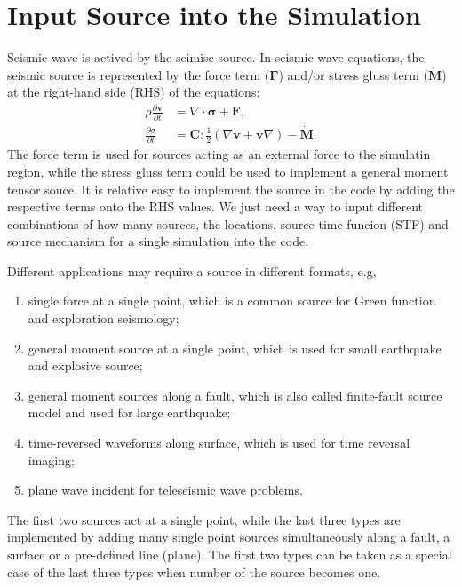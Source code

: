 \chapter{Input Source into the Simulation}\label{chapter-source}

Seismic wave is actived by the seimisc source.
In seismic wave equations, the seismic source is represented by the force term ($\mathbf{F}$)
 and/or stress gluss term ($\mathbf{\dot{\mathbf{M}}}$) at the right-hand side (RHS) of the equations:
\begin{align}
   \rho \frac{\partial \mathbf{v}}{\partial t} &= \nabla \cdot \mathbf{\sigma} + \mathbf{F}, \\
   \frac{\partial \sigma}{\partial t} &= \mathbf{C} : \frac{1}{2} \left( \nabla \mathbf{v} + \mathbf{v} \nabla \right) - \dot{\mathbf{M}}.
\end{align}
The force term is used for sources acting as an external force to the simulatin region,
while the stress gluss term could be used to implement a general moment tensor souce.
It is relative easy to implement the source in the code by adding the respective terms onto the RHS values.
We just need a way to input different combinations of how many sources, the locations, source time funcion (STF) and source mechanism
for a single simulation into the code.


Different applications may require a source in different formats, e.g,
\begin{enumerate}
    \item single force at a single point, which is a common source for Green function and exploration seismology;
    \item general moment source at a single point, which is used for small earthquake and explosive source;
    \item general moment sources along a fault, which is also called finite-fault source model and used for large earthquake;
    \item time-reversed waveforms along surface, which is used for time reversal imaging;
    \item plane wave incident for teleseismic wave problems.
\end{enumerate}
The first two sources act at a single point, while the last three types are implemented by adding many single point sources simultaneously 
along a fault, a surface or a pre-defined line (plane). The first two types can be taken as a special case of the last three types
when number of the source becomes one.



